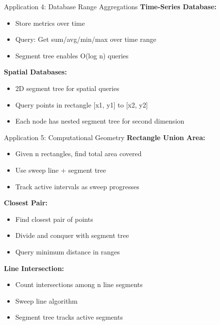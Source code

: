 \documentclass[aspectratio=169]{beamer}
\begin{document}
\begin{frame}{Application 4: Database Range Aggregations}
  \textbf{Time-Series Database:}
  \begin{itemize}
    \item Store metrics over time
    \item Query: Get sum/avg/min/max over time range
    \item Segment tree enables O(log n) queries
  \end{itemize}

  \vspace{0.5cm}
  \textbf{Spatial Databases:}
  \begin{itemize}
    \item 2D segment tree for spatial queries
    \item Query points in rectangle [x1, y1] to [x2, y2]
    \item Each node has nested segment tree for second dimension
  \end{itemize}

  \vspace{0.5cm}
\end{frame}

\begin{frame}{Application 5: Computational Geometry}
  \textbf{Rectangle Union Area:}
  \begin{itemize}
    \item Given n rectangles, find total area covered
    \item Use sweep line + segment tree
    \item Track active intervals as sweep progresses
  \end{itemize}

  \vspace{0.5cm}
  \textbf{Closest Pair:}
  \begin{itemize}
    \item Find closest pair of points
    \item Divide and conquer with segment tree
    \item Query minimum distance in ranges
  \end{itemize}

  \vspace{0.5cm}
  \textbf{Line Intersection:}
  \begin{itemize}
    \item Count intersections among n line segments
    \item Sweep line algorithm
    \item Segment tree tracks active segments
  \end{itemize}
\end{frame}
\end{document}
